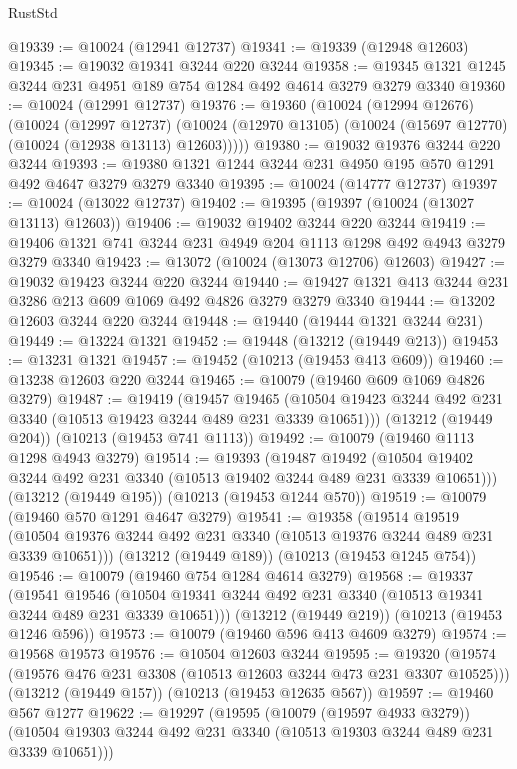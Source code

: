 \begin{lexlean}{RustStd}
\begin{coremodule}
{\begin{coremodule}
{{{{{{{{{{{{{{{{{{{{{{{{{{@19339 := @10024 (@12941 @12737)
@19341 := @19339 (@12948 @12603)
@19345 := @19032 @19341 @3244 @220 @3244
@19358 := @19345 @1321 @1245 @3244 @231 @4951 @189 @754 @1284 @492 @4614 @3279 @3279 @3340
@19360 := @10024 (@12991 @12737)
@19376 := @19360
    (@10024
      (@12994 @12676)
      (@10024
        (@12997 @12737)
        (@10024 (@12970 @13105) (@10024 (@15697 @12770) (@10024 (@12938 @13113) @12603)))))
@19380 := @19032 @19376 @3244 @220 @3244
@19393 := @19380 @1321 @1244 @3244 @231 @4950 @195 @570 @1291 @492 @4647 @3279 @3279 @3340
@19395 := @10024 (@14777 @12737)
@19397 := @10024 (@13022 @12737)
@19402 := @19395 (@19397 (@10024 (@13027 @13113) @12603))
@19406 := @19032 @19402 @3244 @220 @3244
@19419 := @19406 @1321 @741 @3244 @231 @4949 @204 @1113 @1298 @492 @4943 @3279 @3279 @3340
@19423 := @13072 (@10024 (@13073 @12706) @12603)
@19427 := @19032 @19423 @3244 @220 @3244
@19440 := @19427 @1321 @413 @3244 @231 @3286 @213 @609 @1069 @492 @4826 @3279 @3279 @3340
@19444 := @13202 @12603 @3244 @220 @3244
@19448 := @19440 (@19444 @1321 @3244 @231)
@19449 := @13224 @1321
@19452 := @19448 (@13212 (@19449 @213))
@19453 := @13231 @1321
@19457 := @19452 (@10213 (@19453 @413 @609))
@19460 := @13238 @12603 @220 @3244
@19465 := @10079 (@19460 @609 @1069 @4826 @3279)
@19487 := @19419
    (@19457
      @19465
      (@10504 @19423 @3244 @492 @231 @3340 (@10513 @19423 @3244 @489 @231 @3339 @10651)))
    (@13212 (@19449 @204))
    (@10213 (@19453 @741 @1113))
@19492 := @10079 (@19460 @1113 @1298 @4943 @3279)
@19514 := @19393
    (@19487
      @19492
      (@10504 @19402 @3244 @492 @231 @3340 (@10513 @19402 @3244 @489 @231 @3339 @10651)))
    (@13212 (@19449 @195))
    (@10213 (@19453 @1244 @570))
@19519 := @10079 (@19460 @570 @1291 @4647 @3279)
@19541 := @19358
    (@19514
      @19519
      (@10504 @19376 @3244 @492 @231 @3340 (@10513 @19376 @3244 @489 @231 @3339 @10651)))
    (@13212 (@19449 @189))
    (@10213 (@19453 @1245 @754))
@19546 := @10079 (@19460 @754 @1284 @4614 @3279)
@19568 := @19337
    (@19541
      @19546
      (@10504 @19341 @3244 @492 @231 @3340 (@10513 @19341 @3244 @489 @231 @3339 @10651)))
    (@13212 (@19449 @219))
    (@10213 (@19453 @1246 @596))
@19573 := @10079 (@19460 @596 @413 @4609 @3279)
@19574 := @19568 @19573
@19576 := @10504 @12603 @3244
@19595 := @19320
    (@19574 (@19576 @476 @231 @3308 (@10513 @12603 @3244 @473 @231 @3307 @10525)))
    (@13212 (@19449 @157))
    (@10213 (@19453 @12635 @567))
@19597 := @19460 @567 @1277
@19622 := @19297
    (@19595
      (@10079 (@19597 @4933 @3279))
      (@10504 @19303 @3244 @492 @231 @3340 (@10513 @19303 @3244 @489 @231 @3339 @10651)))
}}}}}}}}}}}}}}}}}}}}}}}}}}
\end{coremodule}}
\end{coremodule}
\end{lexlean}

